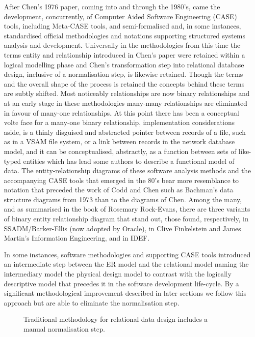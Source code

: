 After Chen's 1976 paper, coming into and through the 1980's, came the development, concurrently, of Computer Aided Software Engineering (CASE) tools, including Meta-CASE tools, and semi-formalised and, in some instances, standardised official methodologies and notations supporting structured systems analysis and development. Universally in the methodologies from this time the terms entity and relationship introduced in Chen's paper were retained within a logical modelling phase and Chen's transformation step into relational database design, inclusive of a normalisation step, is likewise retained. Though the terms and the overall shape of the process is retained the concepts behind these terms are subtly shifted. Most noticeably relationships are now binary relationships and at an early stage in these methodologies many-many relationships are eliminated in favour of many-one relationships. At this point there has been a conceptual volte face for a many-one binary relationship, implementation considerations aside, is a thinly disguised and abstracted pointer between records of a file, such as in a VSAM file system, or a link between records in the network database model, and it can be conceptualised, abstractly, as a function between sets of like-typed entities which has lead some authors to describe a functional model of data. The entity-relationship diagrams of these software analysis methods and the accompanying CASE tools that emerged in the 80's bear more resemblance to notation that preceded the work of Codd and Chen such as Bachman's data structure diagrams from 1973 than to the diagrams of Chen. Among the many, and as summarised in the book of Rosemary Rock-Evans, there are three variants of binary entity relationship diagram that stand out, those found, respectively, in SSADM/Barker-Ellis (now adopted by Oracle), in Clive Finkelstein and James Martin's Information Engineering, and in IDEF.

In some instances, software methodologies and supporting CASE tools introduced an intermediate step between the ER model and the relational model naming the intermediary model the physical design model to contrast with the logically descriptive model that precedes it in the software development life-cycle. By a significant methodological improvement described in later sections we follow this approach but are able to eliminate the normalisation step.
\begin{figure}[H]

\caption{Traditional methodology for relational data design includes a manual normalisation step.}
\end{figure}

